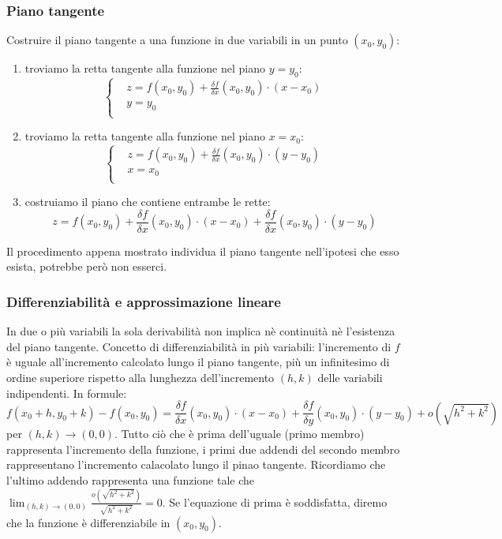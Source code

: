 \subsubsection*{Piano tangente}
Costruire il piano tangente a una funzione in due variabili in un punto $(x_0, y_0)$:
\begin{enumerate}
    \item troviamo la retta tangente alla funzione nel piano $y=y_0$:
    \[
        \begin{cases}
            &z = f(x_0, y_0) + \frac{\delta f}{\delta x}(x_0, y_0) \cdot (x-x_0)\\
            &y=y_0 \\
        \end{cases}
    \]
    \item troviamo la retta tangente alla funzione nel piano $x=x_0$:
    \[
        \begin{cases}
            &z = f(x_0, y_0) + \frac{\delta f}{\delta x}(x_0, y_0) \cdot (y-y_0)\\
            &x=x_0 \\
        \end{cases}
    \]
    \item costruiamo il piano che contiene entrambe le rette:
    \[
        z = f(x_0, y_0) + \frac{\delta f}{\delta x}(x_0, y_0) \cdot (x-x_0) + \frac{\delta f}{\delta x}(x_0, y_0) \cdot (y-y_0)
    \]
\end{enumerate}
Il procedimento appena mostrato individua il piano tangente nell'ipotesi che esso esista, potrebbe però non esserci.
\subsubsection*{Differenziabilità e approssimazione lineare}
In due o più variabili la sola derivabilità non implica nè continuità nè l'esistenza del piano tangente.\newline
Concetto di differenziabilità in più variabili: l'incremento di $f$ è uguale all'incremento calcolato lungo il piano tangente, più un infinitesimo di ordine superiore rispetto alla lunghezza dell'incremento $(h,k)$ delle variabili indipendenti. In formule:
\[
    f(x_0 + h, y_0 + k) - f(x_0, y_0) = \frac{\delta f}{\delta x} (x_0,y_0) \cdot (x-x_0) + \frac{\delta f}{\delta y}(x_0, y_0) \cdot (y-y_0) + o(\sqrt{h^2 + k^2})
\]
per $(h,k) \rightarrow  (0,0)$.\newline
Tutto ciò che è prima dell'uguale (primo membro) rappresenta l'incremento della funzione, i primi due addendi del secondo membro rappresentano l'incremento calacolato lungo il pinao tangente. Ricordiamo che l'ultimo addendo rappresenta una funzione tale che $\lim_{(h,k)\rightarrow (0,0)}\frac{o(\sqrt{h^2 + k^2})}{\sqrt{h^2 + k^2}} = 0$.\newline
Se l'equazione di prima è soddisfatta, diremo che la funzione è differenziabile in $(x_0, y_0)$.\newline

